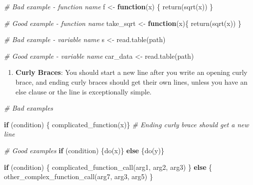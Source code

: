 \documentclass[
]{book}
\newenvironment{Shaded}{\begin{snugshade}}{\end{snugshade}}
\newcommand{\CommentTok}[1]{\textcolor[rgb]{0.56,0.35,0.01}{\textit{#1}}}
\newcommand{\ControlFlowTok}[1]{\textcolor[rgb]{0.13,0.29,0.53}{\textbf{#1}}}
\newcommand{\FunctionTok}[1]{\textcolor[rgb]{0.00,0.00,0.00}{#1}}
\newcommand{\NormalTok}[1]{#1}
\newcommand{\OtherTok}[1]{\textcolor[rgb]{0.56,0.35,0.01}{#1}}
\providecommand{\tightlist}{%
  \setlength{\itemsep}{0pt}\setlength{\parskip}{0pt}}
\begin{document}
\begin{Shaded}
\begin{Highlighting}[]
\CommentTok{\# Bad example {-} function name}
\NormalTok{f }\OtherTok{\textless{}{-}} \ControlFlowTok{function}\NormalTok{(x) \{}
  \FunctionTok{return}\NormalTok{(}\FunctionTok{sqrt}\NormalTok{(x))}
\NormalTok{\}}

\CommentTok{\# Good example {-} function name}
\NormalTok{take\_sqrt }\OtherTok{\textless{}{-}} \ControlFlowTok{function}\NormalTok{(x)\{}
  \FunctionTok{return}\NormalTok{(}\FunctionTok{sqrt}\NormalTok{(x))}
\NormalTok{\}}

\CommentTok{\# Bad example {-} variable name}
\NormalTok{s }\OtherTok{\textless{}{-}} \FunctionTok{read.table}\NormalTok{(path)}

\CommentTok{\# Good example {-} variable name}
\NormalTok{car\_data }\OtherTok{\textless{}{-}} \FunctionTok{read.table}\NormalTok{(path)}
\end{Highlighting}
\end{Shaded}

\begin{enumerate}
\def\labelenumi{\arabic{enumi}.}
\setcounter{enumi}{2}
\tightlist
\item
  \textbf{Curly Braces}: You should start a new line after you write an opening curly brace, and ending curly braces should get their own lines, unless you have an else clause or the line is exceptionally simple.
\end{enumerate}

\begin{Shaded}
\begin{Highlighting}[]
\CommentTok{\# Bad examples}

\ControlFlowTok{if}\NormalTok{ (condition) \{}
  \FunctionTok{complicated\_function}\NormalTok{(x)\} }\CommentTok{\# Ending curly brace should get a new line}

\CommentTok{\# Good examples}
\ControlFlowTok{if}\NormalTok{ (condition) \{}\FunctionTok{do}\NormalTok{(x)\} }\ControlFlowTok{else}\NormalTok{ \{}\FunctionTok{do}\NormalTok{(y)\}}

\ControlFlowTok{if}\NormalTok{ (condition) \{}
  \FunctionTok{complicated\_function\_call}\NormalTok{(arg1, arg2, arg3)}
\NormalTok{\} }\ControlFlowTok{else}\NormalTok{ \{}
  \FunctionTok{other\_complex\_function\_call}\NormalTok{(arg7, arg3, arg5)}
\NormalTok{\}}
\end{Highlighting}
\end{Shaded}
\end{document}
